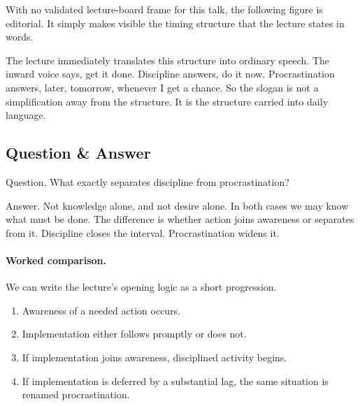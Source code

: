 With no validated lecture-board frame for this talk, the following figure is editorial. It simply makes visible the timing structure that the lecture states in words.

\begin{figure}
\centering
{}
\end{figure}

The lecture immediately translates this structure into ordinary speech. The inward voice says, get it done. Discipline answers, do it now. Procrastination answers, later, tomorrow, whenever I get a chance. So the slogan is not a simplification away from the structure. It is the structure carried into daily language.

\subsection{Question \& Answer}

Question. What exactly separates discipline from procrastination?

Answer. Not knowledge alone, and not desire alone. In both cases we may know what must be done. The difference is whether action joins awareness or separates from it. Discipline closes the interval. Procrastination widens it.

\paragraph{Worked comparison.}
We can write the lecture's opening logic as a short progression.
\begin{enumerate}
\item Awareness of a needed action occurs.
\item Implementation either follows promptly or does not.
\item If implementation joins awareness, disciplined activity begins.
\item If implementation is deferred by a substantial lag, the same situation is renamed procrastination.
\end{enumerate}

